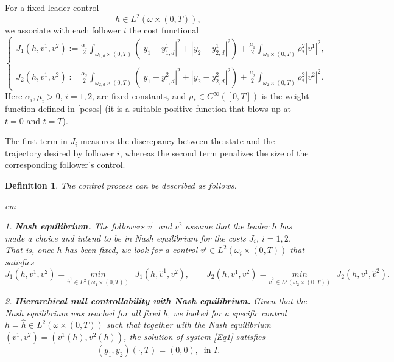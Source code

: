 \documentclass[11pt,a4paper]{amsart}
\numberwithin{equation}{section}
\newtheorem{definition}{Definition}[section]
\begin{document}
For a fixed leader control
\[
h\in L^2(\omega\times(0,T)),
\]
we associate with each follower $i$ the cost functional
        \begin{equation} \label{energy}
            \begin{cases}
                J_1(h , v^1, v^2) := \displaystyle\frac{\alpha_1}{2}\int_{\omega_{1,d}\times (0,T)} (|y_1-y^1_{1,d}|^2+|y_2-y^1_{2,d}|^2)+\frac{\mu_1}{2}\int_{\omega_{1}\times (0,T)} \rho_*^2|v^1|^2, \\
                \\
                J_2(h , v^1, v^2) := \displaystyle\frac{\alpha_2}{2}\int_{\omega_{2,d}\times (0,T)} (|y_1-y^2_{1,d}|^2+|y_2-y^2_{2,d}|^2)+\frac{\mu_2}{2}\int_{\omega_{2}\times (0,T)} \rho_*^2|v^2|^2.  
            \end{cases}
        \end{equation}
        Here $\alpha_i,\mu_i>0$, $i=1,2$, are fixed constants, and $\rho_* \in C^{\infty}([0, T])$ is the weight function defined in \eqref{pesos} (it is a suitable positive function that blows up at $t=0$ and $t=T$). 

The first term in $J_i$ measures the discrepancy between the state and the
	trajectory desired by follower $i$, whereas the second term penalizes the
	size of the corresponding follower's control.    
\begin{definition} The control process can be described as follows.

 cm
 
 1. \textbf{Nash equilibrium.} The followers $v^1$ and $v^2$ assume that the leader $h$ has made a choice and intend to be in Nash equilibrium for the costs $J_i$, $i = 1, 2$. That is, once $h$ has been fixed, we look for a control $v^i\in L^2(\omega_i \times (0,T))$ that satisfies
 \begin{equation*}
     J_1(h, v^1, v^2) = \underset{\widehat{v}^1\in L^2(\omega_1 \times (0,T))}{min} \text{ }J_1(h,\widehat{v}^1, v^2), \qquad
    J_2(h, v^1, v^2) = \underset{\widehat{v}^2\in L^2(\omega_2 \times (0,T))}{min} \text{ }J_2(h, v^1, \widehat{v}^2).
  \end{equation*}

2. \textbf{Hierarchical null controllability with Nash equilibrium.} Given that the Nash equilibrium was reached for all fixed h, we looked for a specific control $h = \widehat{h} \in L^2(\omega\times (0,T))$ such that together with the Nash equilibrium $(v^1,v^2) = (v^1(h),v^2(h))$, the solution of system \eqref{Eq1} satisfies
\begin{equation}
    (y_1,y_2)(\cdot,T) = (0, 0), \ \text{ in } I.
\end{equation}
\end{definition}
\end{document}
